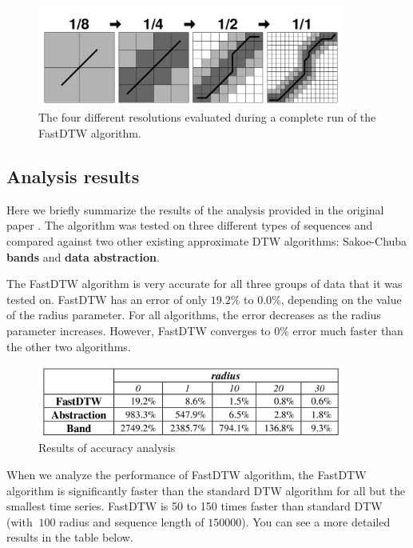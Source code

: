 \begin{figure}[H]
  \centerline{\includegraphics[width=0.9\textwidth]{images/fast_dtw.png}}
  \caption[The four different resolutions evaluated during a complete run of the FastDTW
  algorithm.]{The four different resolutions evaluated during a complete run of the FastDTW
  algorithm.}
  \label{obr:fast_dtw}
\end{figure}

\subsection{Analysis results}

Here we briefly summarize the results of the analysis provided in the original paper
\cite{toward_accurate__dtw}. The algorithm was tested on three different types of sequences and
compared against two other existing approximate DTW algorithms: Sakoe-Chuba \textbf{bands} and
\textbf{data abstraction}.

The FastDTW algorithm is very accurate for all three groups of data that it was tested on. FastDTW
has an error of only $19.2\%$ to $0.0\%$, depending on the value of the radius parameter. For all
algorithms, the error decreases as the radius parameter increases. However, FastDTW converges to
$0\%$ error much faster than the other two algorithms.

\begin{figure}[H]
  \centerline{\includegraphics[width=0.9\textwidth]{images/fast_dtw_analysis.png}}
  \caption[Results of accuracy analysis]{Results of accuracy analysis}
  \label{obr:fast_dtw_analysis}
\end{figure}

When we analyze the performance of FastDTW algorithm, the FastDTW algorithm is significantly faster
than the standard DTW algorithm for all but the smallest time series. FastDTW is 50 to 150 times
faster than standard DTW (with $~100$ radius and sequence length of $150000$). You can see a more
detailed results in the table below.

